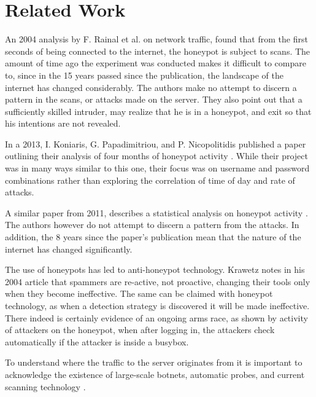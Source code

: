 \section{Related Work}
\label{sec:relatedWork}


An 2004 analysis by F. Rainal et al. \cite{1324605}
on network traffic, found that from the first 
seconds of being connected to the internet, the 
honeypot is subject to scans. The amount of time 
ago the experiment was conducted makes it difficult
to compare to, since in the 15 years passed since the
publication, the landscape of the internet has changed 
considerably. 
The authors  make no attempt to discern a pattern
in the scans, or attacks made on the server. They also
point out that a sufficiently skilled intruder, may 
realize that he is in a honeypot, and exit so that 
his intentions are not revealed.


In a 2013, I. Koniaris, G. Papadimitriou, and 
P. Nicopolitidis published a paper outlining
their analysis of four months of honeypot 
activity \cite{6624967}.
 While their project was in many ways
similar to this one, their focus was on 
username and password combinations rather than
exploring the correlation of time of day and 
rate of attacks. 


A similar paper from 2011, describes a statistical 
analysis on honeypot activity 
\cite{Song:2011:SAH:1978672.1978676}. 
The authors however do not attempt to discern a 
pattern from the attacks. In addition, the 8 years
since the paper's publication mean that the 
nature of the internet has changed significantly. 


The use of honeypots has led to anti-honeypot technology.
Krawetz \cite{1264861} 
notes in his 2004 article that spammers are re-active,
not proactive, changing their tools only when they 
become ineffective. The same can be claimed with honeypot
technology, as when a detection strategy is discovered
it will be made ineffective. There indeed is certainly 
evidence of an ongoing arms race, as shown by activity
of attackers on the honeypot, when after logging in, the
attackers check automatically if the attacker is inside a 
busybox.


To understand where the traffic to the server originates from
it is important to acknowledge the existence of large-scale 
botnets\cite{AbuRajab:2006:MAU:1177080.1177086}, automatic
probes, and current scanning technology \cite{6657498}.

